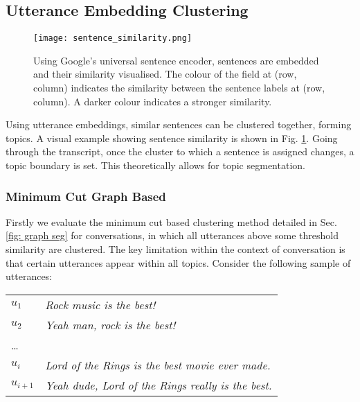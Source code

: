 \subsection{Utterance Embedding Clustering \label{method: utterance embedding clustering}}
    \begin{figure}[t]
        \centering
        \texttt{[image: sentence\_similarity.png]}
        \caption{Using Google's universal sentence encoder, sentences are embedded and their similarity visualised. The colour of the field at (row, column) indicates the similarity between the sentence labels at (row, column). A darker colour indicates a stronger similarity.}
        \label{fig:sentence similarity}
    \end{figure}
    Using utterance embeddings, similar sentences can be clustered together, forming topics. A visual example showing sentence similarity is shown in Fig. \ref{fig:sentence similarity}.
    Going through the transcript, once the cluster to which a sentence is assigned changes, a topic boundary is set. This theoretically allows for topic segmentation.
    
    \subsubsection{Minimum Cut Graph Based \label{method: minimum cut}}
    
        Firstly we evaluate the minimum cut based clustering method detailed in Sec. \ref{fig: graph seg} for conversations, in which all utterances above some threshold similarity are clustered. The key limitation within the context of conversation is that certain utterances appear within all topics. Consider the following sample of utterances:
        \begin{table}[h]
            \begin{tabular}{l|l}
            $u_1$     & \textit{Rock music is the best!}                        \\
            $u_2$     & \textit{Yeah man, rock is the best!}                    \\
            \dots      &                                                         \\
            $u_i$     & \textit{Lord of the Rings is the best movie ever made.} \\
            $u_{i+1}$ & \textit{Yeah dude, Lord of the Rings really is the best.}              \\
            \end{tabular}
        \end{table}
        
